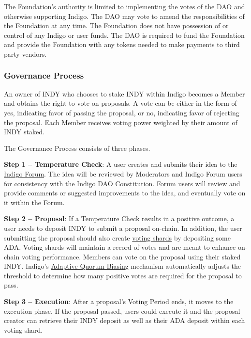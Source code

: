 \documentclass{article}
\begin{document}
\begin{sloppypar}
The Foundation's authority is limited to implementing the votes of the
DAO and otherwise supporting Indigo. The DAO may vote to amend the
responsibilities of the Foundation at any time. The Foundation does not
have possession of or control of any Indigo or user funds. The DAO is
required to fund the Foundation and provide the Foundation with any
tokens needed to make payments to third party vendors.

\hypertarget{governance-process}{%
\subsubsection{Governance Process}\label{governance-process}}

An owner of INDY who chooses to stake INDY within Indigo becomes a
Member and obtains the right to vote on proposals. A vote can be either
in the form of yes, indicating favor of passing the proposal, or no,
indicating favor of rejecting the proposal. Each Member receives voting
power weighted by their amount of INDY staked.

The Governance Process consists of three phases.

\textbf{Step 1 -- Temperature Check}: A user creates and submits their
idea to the \href{https://forum.indigoprotocol.io/}{Indigo Forum}. The
idea will be reviewed by Moderators and Indigo Forum users for
consistency with the Indigo DAO Constitution. Forum users will review
and provide comments or suggested improvements to the idea, and
eventually vote on it within the Forum.

\textbf{Step 2 -- Proposal}: If a Temperature Check results in a
positive outcome, a user needs to deposit INDY to submit a proposal
on-chain. In addition, the user submitting the proposal should also
create \protect\hyperlink{governance-sharding}{voting shards} by
depositing some ADA. Voting shards will maintain a record of votes and
are meant to enhance on-chain voting performance. Members can vote on
the proposal using their staked INDY. Indigo's
\protect\hyperlink{adaptive-quorum-biasing}{Adaptive Quorum Biasing}
mechanism automatically adjusts the threshold to determine how many
positive votes are required for the proposal to pass.

\textbf{Step 3 -- Execution}: After a proposal's Voting Period ends, it
moves to the execution phase. If the proposal passed, users could
execute it and the proposal creator can retrieve their INDY deposit as
well as their ADA deposit within each voting shard.


\end{sloppypar}
\end{document}

